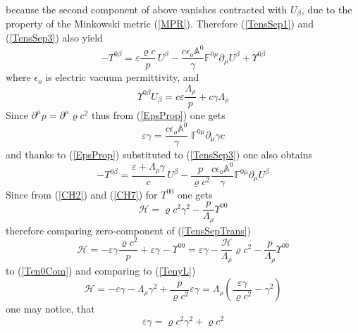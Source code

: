 \documentclass[aps,prx,preprint,groupedaddress,showkeys]{revtex4-2}
\begin{document}
because the second component of above vanishes contracted with $U_{\beta}$, due to the property of the Minkowski metric (\ref{MPR}). Therefore (\ref{TensSep1}) and (\ref{TensSep3}) also yield
\begin{equation} \label{TensSepTrans}
- T^{0 \beta} =  \varepsilon \frac{\varrho c}{p} \, U^{\beta} - \frac{c \epsilon_o \mathbb{A}^0}{\gamma} \mathbb{F}^{0 \mu} \partial_{\mu} U^{\beta} + \Upsilon^{0 \beta}
\end{equation}
where $\epsilon_o$ is electric vacuum permittivity, and
\begin{equation} \label{YUeq}
\Upsilon^{0 \beta} U_{\beta} = c\varepsilon \frac{\Lambda_{\rho}}{p} + c\gamma \Lambda_{\rho}
\end{equation}
Since $\partial^{\mu} p = \partial^{\mu} \varrho c^2$ thus from (\ref{EpsProp}) one gets
\begin{equation} \label{Epsilon}
\varepsilon \gamma = \frac{ c \epsilon_o \mathbb{A}^0}{\gamma} \; \mathbb{F}^{0 \mu} \partial_{\mu} \gamma c 
\end{equation}
and thanks to (\ref{EpsProp}) substituted to (\ref{TensSep3}) one also obtains
\begin{equation} \label{TenyL}
- T^{0 \beta} =  \frac{\varepsilon + \Lambda_{\rho} \gamma}{c} \, U^{\beta} - \frac{p}{\varrho c^2} \frac{c \epsilon_o \mathbb{A}^0}{\gamma } \mathbb{F}^{0 \mu} \partial_{\mu} U^{\beta} 
\end{equation}
Since from (\ref{CH2}) and (\ref{CH7}) for $T^{0 0}$ one gets
\begin{equation} \label{Ten0Com}
\mathcal{H} = \varrho c^2 \gamma^2 - \frac{p}{\Lambda_{\rho}}  \Upsilon^{0 0}
\end{equation}
therefore comparing zero-component of (\ref{TensSepTrans}) 
\begin{equation} \label{0Component1}
\mathcal{H} = - \varepsilon \gamma \frac{\varrho c^2}{p} + \varepsilon \gamma - \Upsilon^{0 0} = \varepsilon \gamma - \frac{\mathcal{H}}{\Lambda_{\rho}} \varrho c^2 - \frac{p}{\Lambda_{\rho}}  \Upsilon^{0 0}
\end{equation}
to (\ref{Ten0Com}) and comparing to (\ref{TenyL}) 
\begin{equation} \label{0Component2}
\mathcal{H} = - \varepsilon \gamma - \Lambda_{\rho} \gamma^2 + \frac{p}{\varrho c^2} \varepsilon \gamma = \Lambda_{\rho} \left ( \frac{\varepsilon \gamma}{\varrho c^2} - \gamma^2  \right )
\end{equation}
one may notice, that
\begin{equation} \label{HQ4e}
\varepsilon \gamma = \varrho c^2 \gamma ^2 + \varrho c^2
\end{equation}
\end{document}

